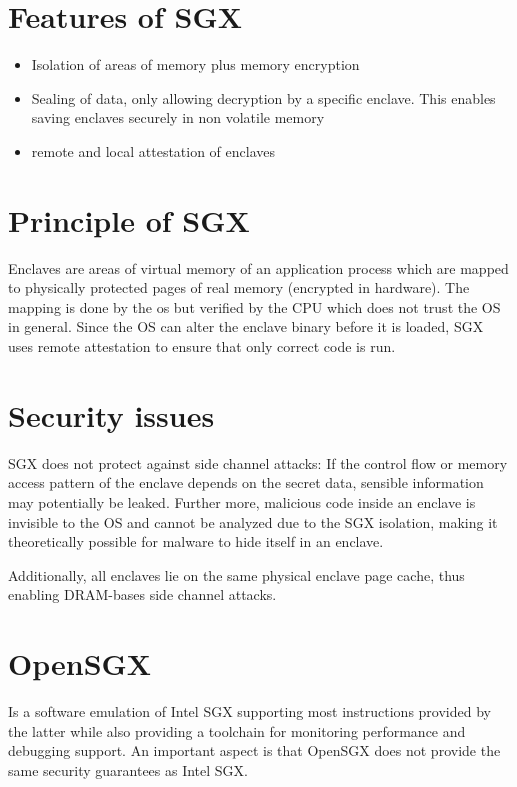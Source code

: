 \documentclass[DIN, pagenumber=false, fontsize=11pt, parskip=half]{scrartcl}
\begin{document}
    \section{Features of SGX}
    \begin{itemize}
        \item Isolation of areas of memory plus memory encryption
        \item Sealing of data, only allowing decryption by a specific enclave. This enables saving enclaves securely in 
              non volatile memory
        \item remote and local attestation of enclaves
    \end{itemize}

    \section{Principle of SGX}
    Enclaves are areas of virtual memory of an application process which are mapped to physically protected pages of real
    memory (encrypted in hardware). The mapping is done by the os but verified by the CPU which does not trust the OS in 
    general. Since the OS can alter the enclave binary before it is loaded, SGX uses remote attestation to ensure that only 
    correct code is run.

    \section{Security issues}
    SGX does not protect against side channel attacks: If the control flow or memory access pattern of the enclave
    depends on the secret data, sensible information may potentially be leaked. Further more, malicious code inside an 
    enclave is invisible to the OS and cannot be analyzed due to the SGX isolation, making it theoretically possible for 
    malware to hide itself in an enclave.

    Additionally, all enclaves lie on the same physical enclave page cache, thus enabling DRAM-bases side channel attacks. 

    \section{OpenSGX}
    Is a software emulation of Intel SGX supporting most instructions provided by the latter while also providing a 
    toolchain for monitoring performance and debugging support. An important aspect is that OpenSGX does not provide the
    same security guarantees as Intel SGX.
\end{document}
